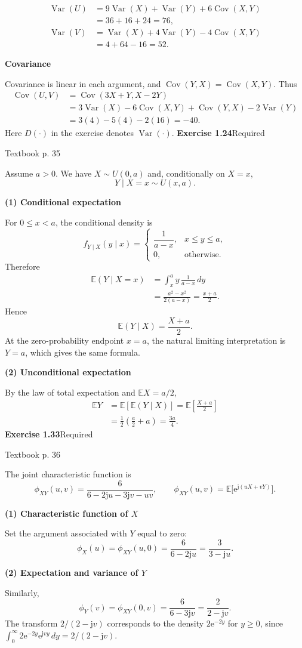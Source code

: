 \documentclass[a4paper,11pt]{article}
\newcommand{\E}{\mathbb E}\newcommand{\Var}{\operatorname{Var}}\newcommand{\Cov}{\operatorname{Cov}}
\newcommand{\jj}{\mathrm j}\newcommand{\ee}{\mathrm e}
\newcommand{\problem}[3]{{\LARGE\bfseries Exercise #1}\hfill #2\par{\small\color{gray}Textbook p. #3}\par\vspace{3mm}}
\newcommand{\step}[1]{\par\textbf{#1}\par}
\begin{document}
\begin{align*}
\Var(U)&=9\Var(X)+\Var(Y)+6\Cov(X,Y)\\
&=36+16+24=\boxed{76},\\[2mm]
\Var(V)&=\Var(X)+4\Var(Y)-4\Cov(X,Y)\\
&=4+64-16=\boxed{52}.
\end{align*}
\step{Covariance}
Covariance is linear in each argument, and $\Cov(Y,X)=\Cov(X,Y)$. Thus
\begin{align*}
\Cov(U,V)&=\Cov(3X+Y,X-2Y)\\
&=3\Var(X)-6\Cov(X,Y)+\Cov(Y,X)-2\Var(Y)\\
&=3(4)-5(4)-2(16)=\boxed{-40}.
\end{align*}
Here $D(\cdot)$ in the exercise denotes $\Var(\cdot)$.
\newpage
\problem{1.24}{Required}{35}
Assume $a>0$. We have $X\sim U(0,a)$ and, conditionally on $X=x$,
\[
Y\mid X=x\sim U(x,a).
\]
\step{(1) Conditional expectation}
For $0\le x<a$, the conditional density is
\[
f_{Y\mid X}(y\mid x)=\begin{cases}
\dfrac1{a-x},&x\le y\le a,\\[1mm]
0,&\text{otherwise}.
\end{cases}
\]
Therefore
\begin{align*}
\E(Y\mid X=x)&=\int_x^a y\,\frac1{a-x}\,dy\\
&=\frac{a^2-x^2}{2(a-x)}=\frac{x+a}{2}.
\end{align*}
Hence
\[
\boxed{\E(Y\mid X)=\frac{X+a}{2}.}
\]
At the zero-probability endpoint $x=a$, the natural limiting interpretation is $Y=a$, which gives the same formula.
\step{(2) Unconditional expectation}
By the law of total expectation and $\E X=a/2$,
\begin{align*}
\E Y&=\E\!\left[\E(Y\mid X)\right]
=\E\!\left[\frac{X+a}{2}\right]\\
&=\frac12\left(\frac a2+a\right)=\boxed{\frac{3a}{4}}.
\end{align*}
\newpage
\problem{1.33}{Required}{36}
The joint characteristic function is
\[
\phi_{XY}(u,v)=\frac6{6-2\jj u-3\jj v-uv},
\qquad\phi_{XY}(u,v)=\E\bigl[\ee^{\jj(uX+vY)}\bigr].
\]
\step{(1) Characteristic function of $X$}
Set the argument associated with $Y$ equal to zero:
\[
\boxed{\phi_X(u)=\phi_{XY}(u,0)=\frac6{6-2\jj u}=\frac3{3-\jj u}.}
\]
\step{(2) Expectation and variance of $Y$}
Similarly,
\[
\phi_Y(v)=\phi_{XY}(0,v)=\frac6{6-3\jj v}=\frac2{2-\jj v}.
\]
The transform $2/(2-\jj v)$ corresponds to the density $2\ee^{-2y}$ for $y\ge0$,
since $\int_0^\infty 2\ee^{-2y}\ee^{\jj vy}\,dy=2/(2-\jj v)$.
\end{document}
